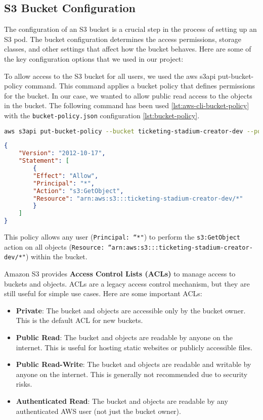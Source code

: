 \subsection{S3 Bucket Configuration}
The configuration of an S3 bucket is a crucial step in the process of setting up an S3 pod. The bucket configuration determines the access permissions, storage classes, and other settings that affect how the bucket behaves. Here are some of the key configuration options that we used in our project:

To allow access to the S3 bucket for all users, we used the aws s3api put-bucket-policy command. This command applies a bucket policy that defines permissions for the bucket. In our case, we wanted to allow public read access to the objects in the bucket. The following command has been used \ref{lst:aws-cli-bucket-policy} with the \texttt{bucket-policy.json} configuration \ref{lst:bucket-policy}.

\begin{lstlisting}[language=bash, caption={AWS CLI command to set a bucket policy}, label={lst:aws-cli-bucket-policy}]
aws s3api put-bucket-policy --bucket ticketing-stadium-creator-dev --policy file://bucket-policy.json
\end{lstlisting}

\begin{lstlisting}[language=json,caption=Bucket policy JSON configuration, label=lst:bucket-policy]
{
    "Version": "2012-10-17",
    "Statement": [
        {
        "Effect": "Allow",
        "Principal": "*",
        "Action": "s3:GetObject",
        "Resource": "arn:aws:s3:::ticketing-stadium-creator-dev/*"
        }
    ]
}
\end{lstlisting}

This policy allows any user (\texttt{Principal: ``*"}) to perform the \texttt{s3:GetObject} action on all objects (\texttt{Resource: ``arn:aws:s3:::ticketing-stadium-creator-dev/*"}) within the bucket.

Amazon S3 provides \textbf{Access Control Lists (ACLs)} to manage access to buckets and objects. ACLs are a legacy access control mechanism, but they are still useful for simple use cases. Here are some important ACLs:

\begin{itemize}
    \item \textbf{Private}: The bucket and objects are accessible only by the bucket owner. This is the default ACL for new buckets.
    \item \textbf{Public Read}: The bucket and objects are readable by anyone on the internet. This is useful for hosting static websites or publicly accessible files.
    \item \textbf{Public Read-Write}: The bucket and objects are readable and writable by anyone on the internet. This is generally not recommended due to security risks.
    \item \textbf{Authenticated Read}: The bucket and objects are readable by any authenticated AWS user (not just the bucket owner).
\end{itemize}

